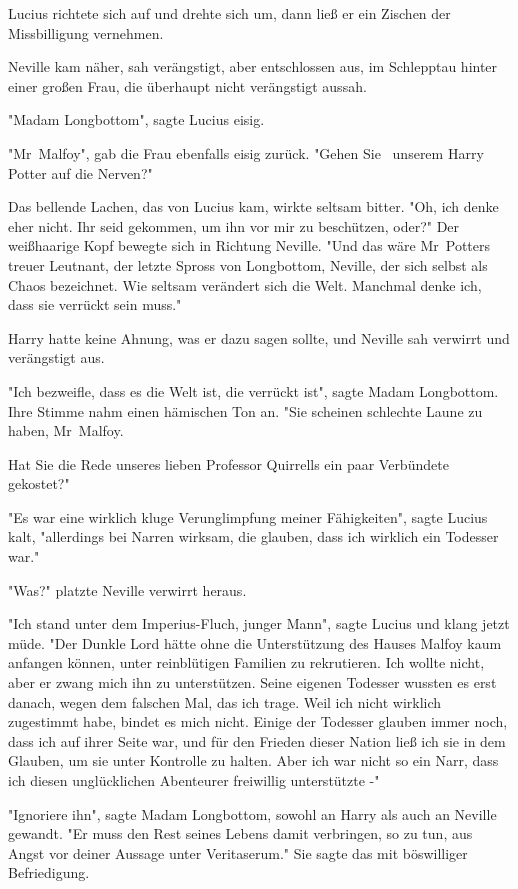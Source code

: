 {Lucius richtete sich auf und drehte sich um, dann ließ er ein Zischen der Missbilligung vernehmen.

Neville kam näher, sah verängstigt, aber entschlossen aus, im Schlepptau hinter einer großen Frau, die überhaupt nicht verängstigt aussah.

"Madam Longbottom", sagte Lucius eisig.

"Mr~Malfoy", gab die Frau ebenfalls eisig zurück. "Gehen Sie ~unserem Harry Potter auf die Nerven?"

Das bellende Lachen, das von Lucius kam, wirkte seltsam bitter. "Oh, ich denke eher nicht. Ihr seid gekommen, um ihn vor mir zu beschützen, oder?" Der weißhaarige Kopf bewegte sich in Richtung Neville. "Und das wäre Mr~Potters treuer Leutnant, der letzte Spross von Longbottom, Neville, der sich selbst als Chaos bezeichnet. Wie seltsam verändert sich die Welt. Manchmal denke ich, dass sie verrückt sein muss."

Harry hatte keine Ahnung, was er dazu sagen sollte, und Neville sah verwirrt und verängstigt aus.

"Ich bezweifle, dass es die Welt ist, die verrückt ist", sagte Madam Longbottom. Ihre Stimme nahm einen hämischen Ton an. "Sie scheinen schlechte Laune zu haben, Mr~Malfoy.

Hat Sie die Rede unseres lieben Professor Quirrells ein paar Verbündete gekostet?"

"Es war eine wirklich kluge Verunglimpfung meiner Fähigkeiten", sagte Lucius kalt, "allerdings bei Narren wirksam, die glauben, dass ich wirklich ein Todesser war."

"Was?" platzte Neville verwirrt heraus.

"Ich stand unter dem Imperius-Fluch, junger Mann", sagte Lucius und klang jetzt müde. "Der Dunkle Lord hätte ohne die Unterstützung des Hauses Malfoy kaum anfangen können, unter reinblütigen Familien zu rekrutieren. Ich wollte nicht, aber er zwang mich ihn zu unterstützen. Seine eigenen Todesser wussten es erst danach, wegen dem falschen Mal, das ich trage. Weil ich nicht wirklich zugestimmt habe, bindet es mich nicht. Einige der Todesser glauben immer noch, dass ich auf ihrer Seite war, und für den Frieden dieser Nation ließ ich sie in dem Glauben, um sie unter Kontrolle zu halten. Aber ich war nicht so ein Narr, dass ich diesen unglücklichen Abenteurer freiwillig unterstützte -"

"Ignoriere ihn", sagte Madam Longbottom, sowohl an Harry als auch an Neville gewandt. "Er muss den Rest seines Lebens damit verbringen, so zu tun, aus Angst vor deiner Aussage unter Veritaserum." Sie sagte das mit böswilliger Befriedigung.

}
